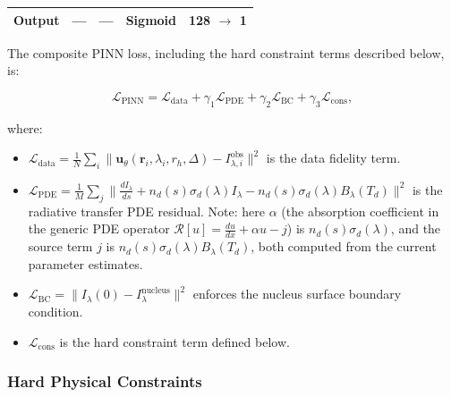 \documentclass[usenatbib]{mnras}
\begin{document}
\begin{table}
\begin{tabular}{lcccc}
\hspace{1em}Output & --- & --- & Sigmoid & 128 $\to$ 1 \\
\bottomrule
\end{tabular}
\end{table}


The composite PINN loss, including the hard constraint terms described below, is:

\begin{equation}\label{eq:pinn_loss}
\mathcal{L}_{\text{PINN}} = \mathcal{L}_{\text{data}} + \gamma_1 \mathcal{L}_{\text{PDE}} + \gamma_2 \mathcal{L}_{\text{BC}} + \gamma_3 \mathcal{L}_{\text{cons}},
\end{equation}

where:
\begin{itemize}
    \item $\mathcal{L}_{\text{data}} = \frac{1}{N}\sum_i \|\mathbf{u}_\theta(\mathbf{r}_i, \lambda_i, r_h, \Delta) - I_{\lambda,i}^{\text{obs}}\|^2$ is the data fidelity term.
    \item $\mathcal{L}_{\text{PDE}} = \frac{1}{M}\sum_j \|\frac{d I_\lambda}{ds} + n_d(s)\sigma_d(\lambda) I_\lambda - n_d(s)\sigma_d(\lambda) B_\lambda(T_d)\|^2$ is the radiative transfer PDE residual. Note: here $\alpha$ (the absorption coefficient in the generic PDE operator $\mathcal{R}[u] = \frac{du}{dx} + \alpha u - j$) is $n_d(s)\sigma_d(\lambda)$, and the source term $j$ is $n_d(s)\sigma_d(\lambda)B_\lambda(T_d)$, both computed from the current parameter estimates.
    \item $\mathcal{L}_{\text{BC}} = \|I_\lambda(0) - I_{\lambda}^{\text{nucleus}}\|^2$ enforces the nucleus surface boundary condition.
    \item $\mathcal{L}_{\text{cons}}$ is the hard constraint term defined below.
\end{itemize}

\subsubsection{Hard Physical Constraints}
\end{document}
